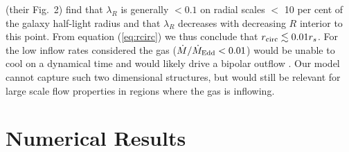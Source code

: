 \documentclass[usenatbib,fleqn]{mn2e}
\newcommand{\eddr}{\dot{M}/\dot{M}_{\rm Edd}}
\begin{document}
\citet{EmsellemCappellari+:2007a} (their Fig.~2) find that $\lambda_R$
is generally $< 0.1$ on radial scales $<$ 10 per cent of the galaxy
half-light radius and that $\lambda_R$ decreases with decreasing $R$
interior to this point.  From equation (\ref{eq:rcirc}) we thus
conclude that $r_{\rm circ} \lesssim 0.01r_{s}$. For the low inflow
rates considered the gas ($\eddr<0.01$) would be unable to cool on a
dynamical time and would likely drive a bipolar outflow
\citep{Li+2013}. Our model cannot capture such two dimensional
structures, but would still be relevant for large scale flow
properties in regions where the gas is inflowing.


\section{Numerical Results}
\label{sec:numerical}
\end{document}
